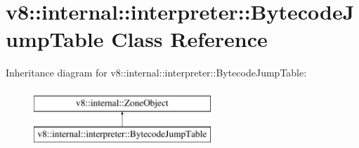 \hypertarget{classv8_1_1internal_1_1interpreter_1_1BytecodeJumpTable}{}\section{v8\+:\+:internal\+:\+:interpreter\+:\+:Bytecode\+Jump\+Table Class Reference}
\label{classv8_1_1internal_1_1interpreter_1_1BytecodeJumpTable}
Inheritance diagram for v8\+:\+:internal\+:\+:interpreter\+:\+:Bytecode\+Jump\+Table\+:\begin{figure}[H]
\begin{center}
\leavevmode
\includegraphics[height=2.000000cm]{classv8_1_1internal_1_1interpreter_1_1BytecodeJumpTable}
\end{center}
\end{figure}
